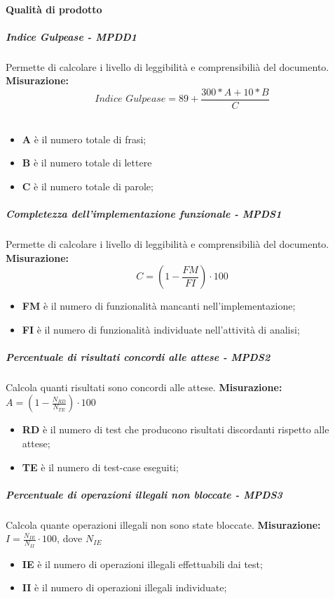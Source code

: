 \paragraph{Qualità di prodotto}
\subparagraph{Indice Gulpease - MPDD1}
Permette di calcolare i livello di leggibilità e comprensibilià del documento.
\textbf{Misurazione:}
\begin{equation}\textit{Indice Gulpease} = 89 + \frac{300 * \textit{A} + 10 * B}{C}\end{equation} \\
\begin{itemize}
	\item \textbf{A} è il numero totale di frasi;
	\item \textbf{B} è il numero totale di lettere
	\item \textbf{C} è il numero totale di parole;
\end{itemize}
\subparagraph{Completezza dell’implementazione funzionale - MPDS1}
Permette di calcolare i livello di leggibilità e comprensibilià del documento.
\textbf{Misurazione:}
\begin{equation}
C=(1-\frac{FM}{FI})\cdot 100
\end{equation}
\begin{itemize}
	\item \textbf{FM} è il numero di funzionalità mancanti nell'implementazione;
	\item \textbf{FI} è il numero di funzionalità individuate nell'attività di analisi;
\end{itemize}
\subparagraph{Percentuale di risultati concordi alle attese - MPDS2}
Calcola quanti risultati sono concordi alle attese.
\textbf{Misurazione:}
$A=(1-\frac{N_{RD}}{N_{TE}}) \cdot 100$
\begin{itemize}
	\item \textbf{RD} è il numero di test che producono risultati discordanti rispetto alle attese;
	\item \textbf{TE}  è il numero di test-case eseguiti;
\end{itemize}
\subparagraph{Percentuale di operazioni illegali non bloccate - MPDS3}
Calcola quante operazioni illegali non sono state bloccate.
\textbf{Misurazione:}
$I=\frac{N_{IE}}{N_{II}} \cdot 100$, dove $N_{IE}$
\begin{itemize}
	\item \textbf{IE} è il numero di operazioni illegali effettuabili dai test;
	\item \textbf{II} è il numero di operazioni illegali individuate;
\end{itemize}

